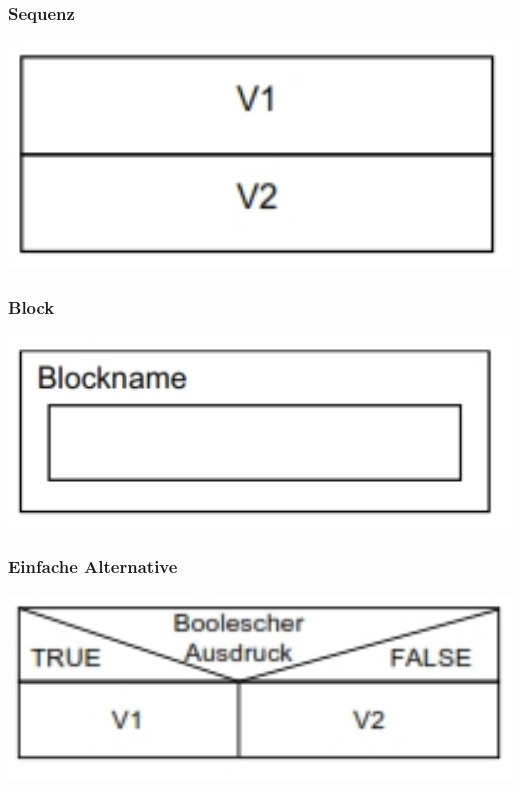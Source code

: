 		\begin{minipage}[t]{6 cm}
			\subsubsection{Sequenz}
				\includegraphics[width=1\textwidth]{pics/Nassi_Sequenz.jpg}
				
			\subsubsection{Block}
				\includegraphics[width=1\textwidth]{pics/Nassi_Block.jpg}	
					
			\subsubsection{Einfache Alternative}
				\includegraphics[width=1\textwidth]{pics/Nassi_einfache_Alternative.jpg}
					
		\end{minipage}

